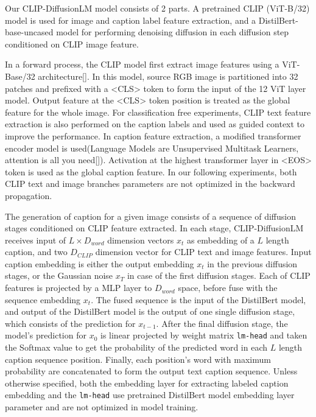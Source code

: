 \documentclass{article}
\begin{document}
Our CLIP-DiffusionLM model consists of 2 parts. A pretrained CLIP (ViT-B/32) model is used for image and caption label feature extraction, and a DistilBert-base-uncased model for performing denoising diffusion in each diffusion step conditioned on CLIP image feature.

In a forward process, the CLIP model first extract image features using a ViT-Base/32 architecture[]. In this model, source RGB image is partitioned into 32 patches and prefixed with a <CLS> token to form the input of the 12 ViT layer model. Output feature at the <CLS> token position is treated as the global feature for the whole image. For classification free experiments{}, CLIP text feature extraction is also performed on the caption labels and used as guided context to improve the performance. In caption feature extraction, a modified transformer encoder model is used(Language Models are Unsupervised Multitask Learners, attention is all you need[]). Activation at the highest transformer layer in <EOS> token is used as the global caption feature. In our following experiments, both CLIP text and image branches parameters are not optimized in the backward propagation.

The generation of caption for a given image consists of a sequence of diffusion stages conditioned on CLIP feature extracted. In each stage, CLIP-DiffusionLM receives input of $L \times D_{word}$ dimension vectors $x_t$ as embedding of a $L$ length caption, and two $D_{CLIP}$ dimension vector for CLIP text and image features. Input caption embedding is either the output embedding $x_t$ in the previous diffusion stages, or the Gaussian noise $x_T$ in case of the first diffusion stages. Each of CLIP features is projected by a MLP layer to $D_{word}$ space, before fuse{} with the sequence embedding $x_t$. The fused sequence is the input of the DistilBert model, and output of the DistilBert model is the output of one single diffusion stage, which consists of the prediction for $x_{t-1}$. After the final diffusion stage, the model's prediction for $x_0$ is linear projected by weight matrix \texttt{lm-head} and taken the Softmax value to get the probability of the predicted word in each $L$ length caption sequence position. Finally, each position's word with maximum probability are concatenated to form the output text caption sequence. Unless otherwise specified, both the embedding layer for extracting labeled caption embedding and the \texttt{lm-head} use pretrained DistilBert model embedding layer parameter and are not optimized in model training{}.
\end{document}
